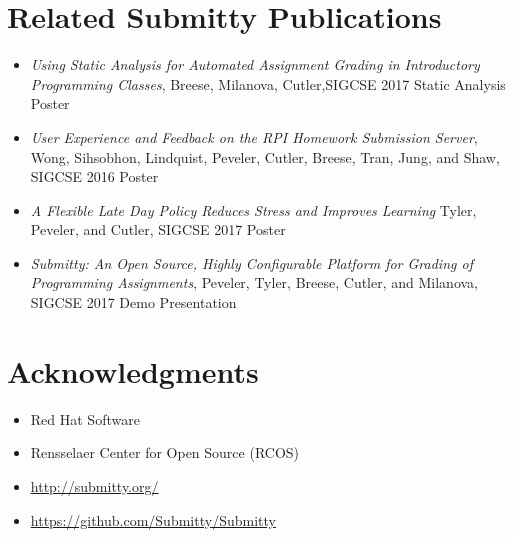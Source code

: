 \documentclass[thesis]{hmcposter}
\begin{document}
\begin{poster}
\section{Related Submitty Publications}
\begin{itemize}
\item \textit{Using Static Analysis for Automated Assignment Grading in Introductory Programming Classes}, Breese, Milanova, Cutler,SIGCSE 2017 Static Analysis Poster 
\item \textit{User Experience and Feedback on the RPI Homework Submission Server}, Wong, Sihsobhon, Lindquist, Peveler, Cutler, Breese, Tran, Jung, and Shaw, SIGCSE 2016 Poster 
\item \textit{A Flexible Late Day Policy Reduces Stress and Improves Learning} Tyler, Peveler, and Cutler,
SIGCSE 2017 Poster
\item \textit{Submitty: An Open Source, Highly Configurable Platform for Grading of Programming Assignments}, Peveler, Tyler, Breese, Cutler, and Milanova, SIGCSE 2017 Demo Presentation
\end{itemize}

\section{Acknowledgments}
\begin{itemize}
    \item Red Hat Software
    \item Rensselaer Center for Open Source (RCOS)
    \item \url{http://submitty.org/}
    \item \url{https://github.com/Submitty/Submitty}
\end{itemize}

\end{poster}
\end{document}
